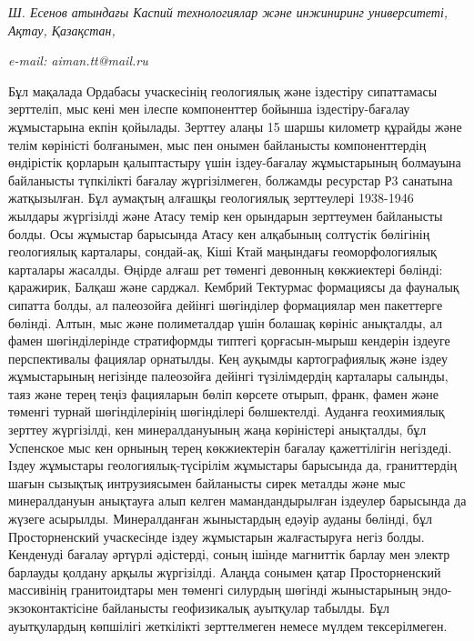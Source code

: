 \begin{affiliation}
\emph{Ш. Есенов атындағы Каспий технологиялар және инжиниринг университеті, Ақтау, Қазақстан,}

\emph{e-mail: aiman.tt@mail.ru}
\end{affiliation}

Бұл мақалада Ордабасы учаскесінің геологиялық және іздестіру сипаттамасы
зерттеліп, мыс кені мен ілеспе компоненттер бойынша іздестіру-бағалау
жұмыстарына екпін қойылады. Зерттеу алаңы 15 шаршы километр құрайды және
телім көріністі болғанымен, мыс пен онымен байланысты компоненттердің
өндірістік қорларын қалыптастыру үшін іздеу-бағалау жұмыстарының
болмауына байланысты түпкілікті бағалау жүргізілмеген, болжамды
ресурстар Р3 санатына жатқызылған. Бұл аумақтың алғашқы геологиялық
зерттеулері 1938-1946 жылдары жүргізілді және Атасу темір кен орындарын
зерттеумен байланысты болды. Осы жұмыстар барысында Атасу кен алқабының
солтүстік бөлігінің геологиялық карталары, сондай-ақ, Кіші Ктай
маңындағы геоморфологиялық карталары жасалды. Өңірде алғаш рет төменгі
девонның көкжиектері бөлінді: қаражирик, Балқаш және сарджал. Кембрий
Тектурмас формациясы да фауналық сипатта болды, ал палеозойға дейінгі
шөгінділер формациялар мен пакеттерге бөлінді. Алтын, мыс және
полиметалдар үшін болашақ көрініс анықталды, ал фамен шөгінділерінде
стратиформды типтегі қорғасын-мырыш кендерін іздеуге перспективалы
фациялар орнатылды. Кең ауқымды картографиялық және іздеу жұмыстарының
негізінде палеозойға дейінгі түзілімдердің карталары салынды, таяз және
терең теңіз фацияларын бөліп көрсете отырып, франк, фамен және төменгі
турнай шөгінділерінің шөгінділері бөлшектелді. Ауданға геохимиялық
зерттеу жүргізілді, кен минералдануының жаңа көріністері анықталды, бұл
Успенское мыс кен орнының терең көкжиектерін бағалау қажеттілігін
негіздеді. Іздеу жұмыстары геологиялық-түсірілім жұмыстары барысында да,
граниттердің шағын сызықтық интрузиясымен байланысты сирек металды және
мыс минералдануын анықтауға алып келген мамандандырылған іздеулер
барысында да жүзеге асырылды. Минералданған жыныстардың едәуір ауданы
бөлінді, бұл Просторненский учаскесінде іздеу жұмыстарын жалғастыруға
негіз болды. Кенденуді бағалау әртүрлі әдістерді, соның ішінде магниттік
барлау мен электр барлауды қолдану арқылы жүргізілді. Алаңда сонымен
қатар Просторненский массивінің гранитоидтары мен төменгі силурдың
шөгінді жыныстарының эндо-экзоконтактісіне байланысты геофизикалық
ауытқулар табылды. Бұл ауытқулардың көпшілігі жеткілікті зерттелмеген
немесе мүлдем тексерілмеген.

